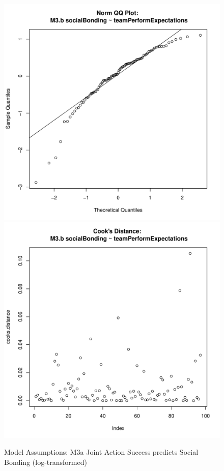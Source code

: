\documentclass[12pt]{report}
\begin{document}
{\begin{figure}[htbp]
  \includegraphics[scale =.4]{../images/MLM3bQQNorm.pdf}
  \includegraphics[scale =.4]{../images/MLM3bCooksD.pdf}
  \caption{Model Assumptions: M3a Joint Action Success predicts Social Bonding (log-transformed)}
  \label{fig:MLM3bAssumptions}
\end{figure}

}
\end{document}
